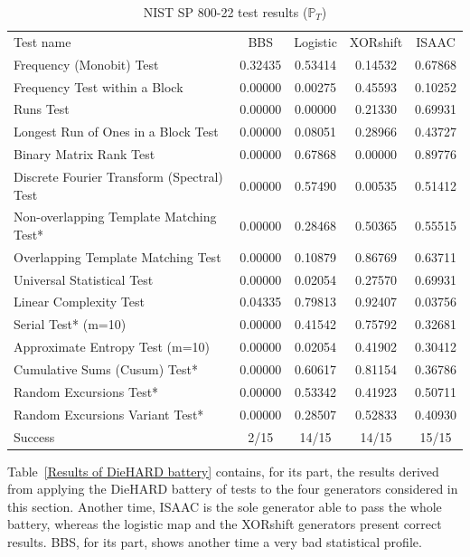 \begin{table}
\renewcommand{\arraystretch}{1.3}
\caption{NIST SP 800-22 test results ($\mathbb{P}_T$)}
\label{The passing1}
\centering
\begin{tabular}{lcccc}
\toprule
Test name & BBS &Logistic& XORshift& ISAAC\\ 

Frequency (Monobit) Test 			&0.32435	&0.53414		&0.14532		&0.67868 \\ 
Frequency Test within a Block			&0.00000	&0.00275		&0.45593		&0.10252 \\ 
Runs Test 					&0.00000	&0.00000		&0.21330		&0.69931\\ 
Longest Run of Ones in a Block Test 		&0.00000	&0.08051		&0.28966		&0.43727 \\
Binary Matrix Rank Test 			&0.00000	&0.67868		&0.00000		&0.89776\\ 
Discrete Fourier Transform (Spectral) Test	&0.00000	&0.57490		&0.00535		&0.51412 \\ 
Non-overlapping Template Matching Test* 	&0.00000	&0.28468		&0.50365		&0.55515\\ 
Overlapping Template Matching Test 		&0.00000	&0.10879		&0.86769		&0.63711\\ 
Universal Statistical Test 			&0.00000	&0.02054		&0.27570		&0.69931 \\ 
Linear Complexity Test		        	&0.04335	&0.79813		&0.92407		&0.03756\\ 
Serial Test* (m=10) 				&0.00000	&0.41542		&0.75792		&0.32681 \\ 
Approximate Entropy Test (m=10) 		&0.00000	&0.02054		&0.41902		&0.30412\\ 
Cumulative Sums (Cusum) Test* 			&0.00000	&0.60617		&0.81154		&0.36786\\ 
Random Excursions Test* 			&0.00000	&0.53342		&0.41923		&0.50711 \\ 
Random Excursions Variant Test* 		&0.00000	&0.28507		&0.52833		&0.40930\\ \hline
Success 					&2/15 	&14/15		&14/15			&15/15 \\ 
\bottomrule
\end{tabular}
\end{table}

\label{Subsec:DieHARD}

Table~\ref{Results of DieHARD battery} contains, for its part, 
the results derived from applying the DieHARD battery of 
tests to the four generators considered in this section.
Another time, ISAAC is the sole generator able to pass the
whole battery, whereas the logistic map and the XORshift
generators present correct results. BBS, for its part, shows
another time a very bad statistical profile.

